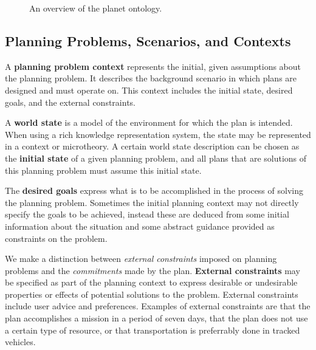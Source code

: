 \begin{figure}[tb]
\centerline{}
\vspace*{-2in}
\caption{An overview of the {\sc planet} ontology.}
\label{planet-ont}
\end{figure}

\subsection{Planning Problems, Scenarios, and Contexts}

A {\bf planning problem context} represents
the initial, given assumptions about the planning problem. 
It describes the background scenario in which plans
are designed and must operate on.
This context includes the initial state, 
desired goals, and the external constraints.

A {\bf world state} is a model of the environment for which the plan
is intended.
When using a rich knowledge representation system, the state
may be represented in a context or microtheory.
A certain world state description can be chosen as the {\bf initial state} 
of a given planning problem,
and all plans that
are solutions of this planning problem must assume this initial state.


The {\bf desired goals} express what is to be accomplished in the process of 
solving the planning problem.
Sometimes the initial planning context may not directly 
specify the goals to be achieved, instead these are deduced from some
initial information about the situation and 
some abstract guidance provided as constraints on the problem.


We make a distinction between {\em external constraints} imposed on 
planning problems and the {\em commitments} made by the plan.
{\bf External constraints} may be specified as part of the
planning context to express desirable or undesirable
properties or effects of potential solutions to the problem.  
External constraints include user advice and preferences.
Examples of external constraints are that the plan accomplishes a mission 
in a period of seven days, 
that the plan does not use a certain type of resource,
or that transportation is preferrably done in tracked vehicles.

